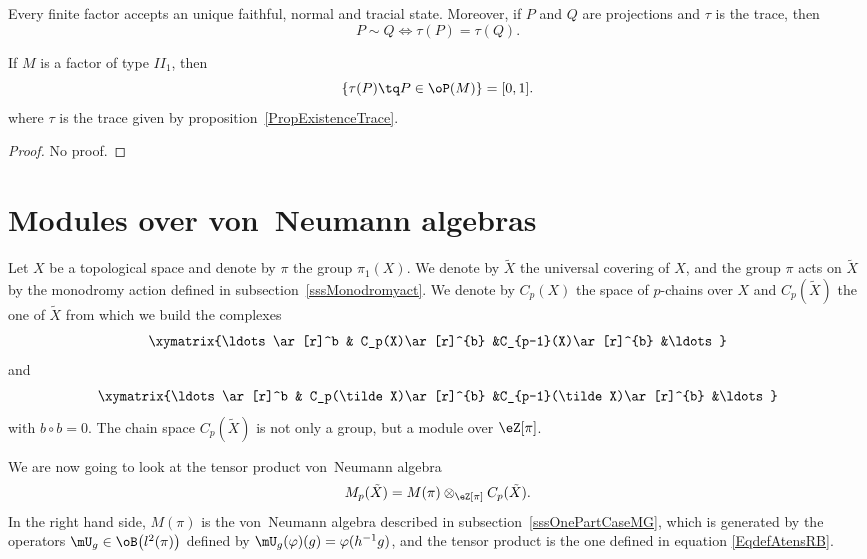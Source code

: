 \begin{proposition}		\label{PropExistenceTrace}
	Every finite factor accepts an unique faithful, normal and tracial state. Moreover, if $P$ and $Q$ are projections and $\tau$ is the trace, then
	\begin{equation}
		P\sim Q\Leftrightarrow \tau(P)=\tau(Q).
	\end{equation}
\end{proposition}

\begin{proposition}	\label{PropFactIIunttedim}						
	If $M$ is a factor of type $II_1$, then
	\begin{equation}
		\{ \tau(P)\tq P\in \oP(M) \}=[0,1].
	\end{equation}
	where $\tau$ is the trace given by proposition~\ref{PropExistenceTrace}.
\end{proposition}

\begin{proof}
	No proof.
\end{proof}
\section{Modules over von~Neumann algebras}
\label{SecOverModVNalgDim}

Let $X$ be a topological space and denote by $\pi$ the group $\pi_1(X)$. We denote by $\tilde X$ the universal covering of $X$, and the group $\pi$ acts on $\tilde X$ by the monodromy action defined in subsection~\ref{sssMonodromyact}. We denote by $C_p(X)$ the space of $p$-chains over $X$ and $C_p(\tilde X)$ the one of $\tilde X$ from which we build the complexes
\[
	\xymatrix{%
	\ldots \ar[r]^b	&	C_p(X)\ar[r]^{b}	&C_{p-1}(X)\ar[r]^{b}	&\ldots
	}
\]
and
\[
	\xymatrix{%
	\ldots \ar[r]^b	&	C_p(\tilde X)\ar[r]^{b}	&C_{p-1}(\tilde X)\ar[r]^{b}	&\ldots
	}
\]
with $b\circ b=0$. The chain space $C_p(\tilde X)$ is not only a group, but a module over $\eZ[\pi]$.

We are now going to look at the tensor product von~Neumann algebra
\begin{equation}
	M_p(\tilde X)=M(\pi)\otimes_{\eZ[\pi]}C_p(\tilde X).
\end{equation}
In the right hand side, $M(\pi)$ is the von~Neumann algebra described in subsection~\ref{sssOnePartCaseMG}, which is generated by the operators $\mU_g\in\oB\big( l^2(\pi) \big)$ defined by $\mU_g(\varphi)(g)=\varphi(h^{-1}g)$, and the tensor product is the one defined in equation \eqref{EqdefAtensRB}.

